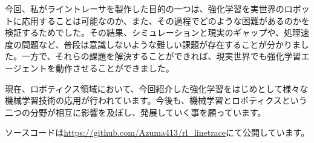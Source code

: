 今回、私がライントレーサを製作した目的の一つは、強化学習を実世界のロボットに応用することは可能なのか、また、その過程でどのような困難があるのかを検証するためでした。その結果、シミュレーションと現実のギャップや、処理速度の問題など、普段は意識しないような難しい課題が存在することが分かりました。一方で、それらの課題を解決することができれば、現実世界でも強化学習エージェントを動作させることができました。

現在、ロボティクス領域において、今回紹介した強化学習をはじめとして様々な機械学習技術の応用が行われています。今後も、機械学習とロボティクスという二つの分野が相互に影響を及ぼし、発展していく事を願っています。

ソースコードは\url{https://github.com/Azuma413/rl_linetrace}にて公開しています。

